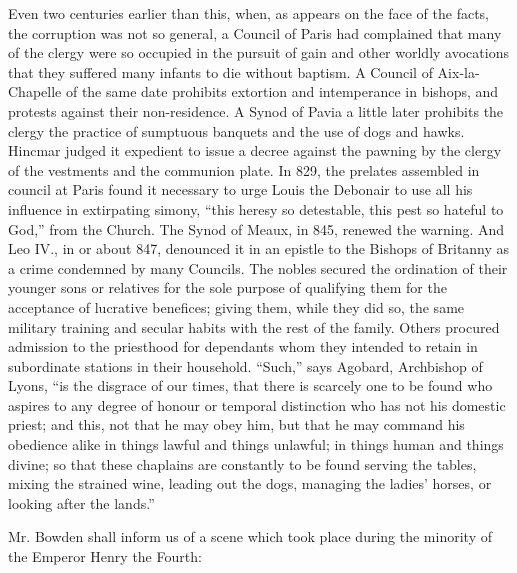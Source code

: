 Even two centuries earlier than this, when, as
appears on the face of the facts, the corruption was not so
general, a Council of Paris had complained that many of the clergy
were so occupied in the pursuit of gain and other worldly avocations
that they suffered many infants to die without baptism. A Council of
Aix-la-Chapelle of the same date prohibits extortion and intemperance
in bishops, and protests against their non-residence. A Synod of Pavia
a little later prohibits the clergy the practice of sumptuous banquets
and the use of dogs and hawks. Hincmar judged it expedient to issue a
decree against the pawning by the clergy of the vestments and the
communion plate. In 829, the prelates assembled in council at Paris
found it necessary to urge Louis the Debonair to use all his influence
in extirpating simony, ``this heresy so detestable, this pest so
hateful to God,'' from the Church. The Synod of Meaux, in 845, renewed
the warning. And Leo IV., in or about 847, denounced it in an epistle
to the Bishops of Britanny as a crime condemned by many Councils. The
nobles secured the ordination of their younger sons or relatives for
the sole purpose of qualifying them for the acceptance of lucrative
benefices; giving them, while they did so, the same military training
and secular habits with the rest of the family. Others procured
admission to the priesthood for dependants whom they intended to
retain in subordinate stations in their household. ``Such,'' says
Agobard, Archbishop of Lyons, ``is the disgrace of our times, that
there is scarcely one to be found who aspires to any degree of honour
or temporal distinction who has not his domestic priest; and this, not
that he may obey him, but that he may command his obedience alike in
things lawful and things unlawful; in things human and things divine;
so that these chaplains are constantly to be found serving the tables,
mixing the strained wine, leading out the dogs, managing the
ladies' horses, or looking after the lands.''

Mr. Bowden shall inform us of a scene which took
place during the minority of the Emperor Henry the Fourth:

